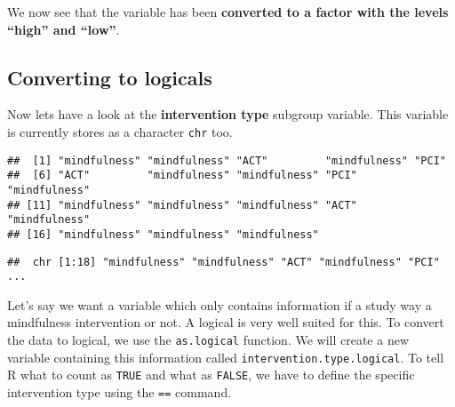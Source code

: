 \documentclass[]{book}
\newenvironment{Shaded}{\begin{snugshade}}{\end{snugshade}}
\newcommand{\KeywordTok}[1]{\textcolor[rgb]{0.13,0.29,0.53}{\textbf{#1}}}
\newcommand{\DataTypeTok}[1]{\textcolor[rgb]{0.13,0.29,0.53}{#1}}
\newcommand{\StringTok}[1]{\textcolor[rgb]{0.31,0.60,0.02}{#1}}
\newcommand{\OperatorTok}[1]{\textcolor[rgb]{0.81,0.36,0.00}{\textbf{#1}}}
\newcommand{\NormalTok}[1]{#1}
\theoremstyle{definition}
\theoremstyle{definition}
\theoremstyle{definition}
\theoremstyle{remark}
\begin{document}
We now see that the variable has been \textbf{converted to a factor with
the levels ``high'' and ``low''}.

\subsection{Converting to logicals}\label{converting-to-logicals}

Now lets have a look at the \textbf{intervention type} subgroup
variable. This variable is currently stores as a character \texttt{chr}
too.

\begin{Shaded}
\end{Shaded}

\begin{verbatim}
##  [1] "mindfulness" "mindfulness" "ACT"         "mindfulness" "PCI"        
##  [6] "ACT"         "mindfulness" "mindfulness" "PCI"         "mindfulness"
## [11] "mindfulness" "mindfulness" "mindfulness" "ACT"         "mindfulness"
## [16] "mindfulness" "mindfulness" "mindfulness"
\end{verbatim}

\begin{Shaded}
\end{Shaded}

\begin{verbatim}
##  chr [1:18] "mindfulness" "mindfulness" "ACT" "mindfulness" "PCI" ...
\end{verbatim}

Let's say we want a variable which only contains information if a study
way a mindfulness intervention or not. A logical is very well suited for
this. To convert the data to logical, we use the \texttt{as.logical}
function. We will create a new variable containing this information
called \texttt{intervention.type.logical}. To tell R what to count as
\texttt{TRUE} and what as \texttt{FALSE}, we have to define the specific
intervention type using the \texttt{==} command.

\begin{Shaded}
\end{Shaded}
\end{document}
